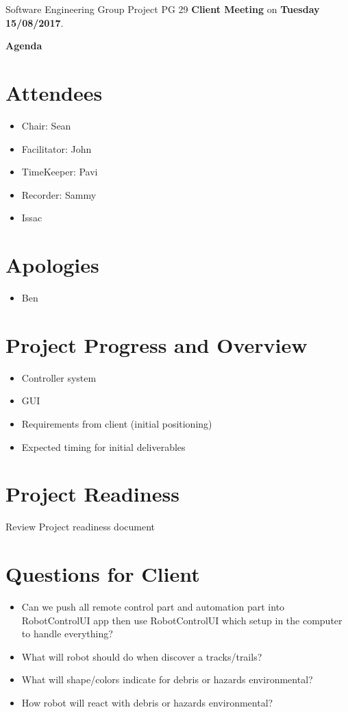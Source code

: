 \documentclass[11pt, a4paper]{article}
\begin{document}
\noindent Software Engineering Group Project PG 29 {\bf Client Meeting} on {\bf Tuesday 15/08/2017}.
\vspace*{10pt}
\begin{center}
\huge \bf Agenda
\end{center}

\section{Attendees}
\begin{itemize}
\item Chair: Sean
\item Facilitator: John
\item TimeKeeper: Pavi
\item Recorder: Sammy
\item Issac
\end{itemize}

\section{Apologies}
\begin{itemize}
\item Ben
\end{itemize}

\section{Project Progress and Overview}
\begin{itemize}
	\item Controller system 
	\item GUI
	\item Requirements from client (initial positioning)
	\item Expected timing for initial deliverables
\end{itemize}

\section{Project Readiness}
Review Project readiness document

\section{Questions for Client}
\begin{itemize}
	\item Can we push all remote control part and automation part into RobotControlUI app then use RobotControlUI which setup in the computer to handle everything?
	\item What will robot should do when discover a tracks/trails?
	\item What will shape/colors indicate for debris or hazards environmental?
	\item How robot will react with debris or hazards environmental?
\end{itemize}
\end{document}
